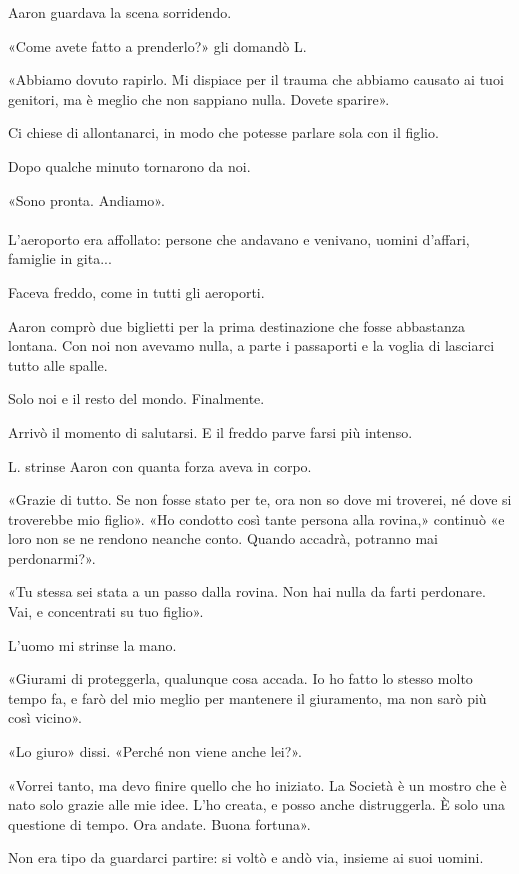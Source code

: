\documentclass[a4paper,12pt]{book}
\begin{document}
Aaron guardava la scena sorridendo.

«Come avete fatto a prenderlo?» gli domandò L.

«Abbiamo dovuto rapirlo. Mi dispiace per il trauma che abbiamo causato ai tuoi
genitori, ma è meglio che non sappiano nulla. Dovete sparire».

Ci chiese di allontanarci, in modo che potesse parlare sola con il figlio.

Dopo qualche minuto tornarono da noi.

«Sono pronta. Andiamo».

\paragraph{}
L'aeroporto era affollato: persone che andavano e venivano, uomini d'affari,
famiglie in gita...

Faceva freddo, come in tutti gli aeroporti.

Aaron comprò due biglietti per la prima destinazione che fosse abbastanza
lontana. Con noi non avevamo nulla, a parte i passaporti e la voglia di
lasciarci tutto alle spalle.

Solo noi e il resto del mondo. Finalmente.

Arrivò il momento di salutarsi. E il freddo parve farsi più intenso.

L. strinse Aaron con quanta forza aveva in corpo.

«Grazie di tutto. Se non fosse stato per te, ora non so dove mi troverei, né
dove si troverebbe mio figlio». «Ho condotto così tante persona alla rovina,»
continuò «e loro non se ne rendono neanche conto. Quando accadrà, potranno mai
perdonarmi?».

«Tu stessa sei stata a un passo dalla rovina. Non hai nulla da farti perdonare.
Vai, e concentrati su tuo figlio».

L'uomo mi strinse la mano.

«Giurami di proteggerla, qualunque cosa accada. Io ho fatto lo stesso molto
tempo fa, e farò del mio meglio per mantenere il giuramento, ma non sarò più
così vicino».

«Lo giuro» dissi. «Perché non viene anche lei?».

«Vorrei tanto, ma devo finire quello che ho iniziato. La Società è un mostro che
è nato solo grazie alle mie idee. L'ho creata, e posso anche distruggerla. È
solo una questione di tempo. Ora andate. Buona fortuna».

Non era tipo da guardarci partire: si voltò e andò via, insieme ai suoi uomini.
\end{document}
